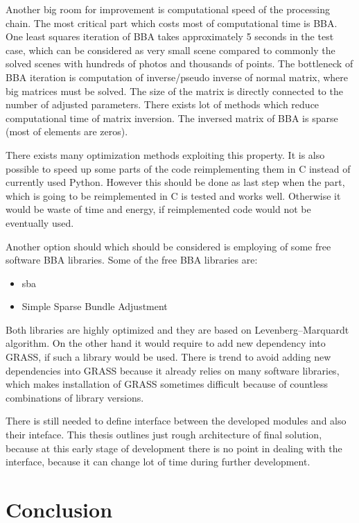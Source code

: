 \documentclass[a4paper,12pt]{article}
\begin{document}
Another big room for improvement is computational speed of the processing chain.
The most critical part which costs most of computational time is BBA.
One least squares  iteration of BBA takes approximately 5 seconds in the test case, which can be 
considered as very small scene compared to commonly the solved
scenes with hundreds of photos and thousands of points. The bottleneck of BBA iteration is computation of inverse/pseudo inverse of normal matrix, 
where big matrices must be solved. 
The size of the matrix is directly connected to the number of adjusted parameters. There exists  lot of methods which reduce computational 
time of matrix inversion. The inversed matrix of BBA is sparse (most of elements are zeros).

There exists many optimization methods exploiting this property. 
It is also possible to speed up some parts of the code reimplementing them in C instead of currently used Python. However this should be done 
as last step when the part, which is going to be reimplemented in C is tested and works well. Otherwise it would be waste of time and energy, if reimplemented 
code would not be eventually used. 

Another option should which should  be considered is employing of some free software BBA libraries.
Some of the free BBA libraries are:
\begin{itemize}
\item sba
\item Simple Sparse Bundle Adjustment 
\end{itemize}

Both libraries are highly optimized and they are based on Levenberg–Marquardt algorithm.
On the other hand it would require to add new dependency into GRASS, if such a library would be used. 
There is trend to avoid adding new dependencies into GRASS because it already relies on many software libraries,
which makes installation of GRASS sometimes difficult because of countless combinations of library versions.



There is still needed to define interface between the developed modules and also their inteface. 
This thesis outlines just rough architecture of final solution, because at this early stage of development 
there is no point in dealing with the interface, because it can change lot of time during further development.


\section{Conclusion}
\end{document}
